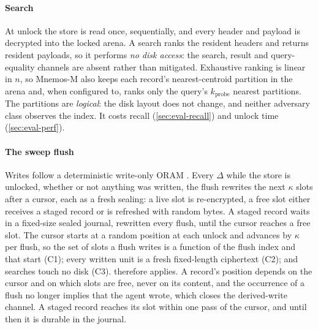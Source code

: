 \paragraph{Search} At unlock the store is read once, sequentially, and every header and payload is
decrypted into the locked arena. A search ranks the resident headers and returns resident payloads,
so it performs \emph{no disk access}: the search, result and query-equality channels are absent
rather than mitigated. Exhaustive ranking is linear in $n$, so Mnemos-M also keeps each record's
nearest-centroid partition in the arena and, when configured to, ranks only the query's $k_{\mathrm{probe}}$
nearest partitions. The partitions are \emph{logical}: the disk layout does not change, and neither adversary
class observes the index. It costs recall (\cref{sec:eval-recall}) and unlock time
(\cref{sec:eval-perf}).

\paragraph{The sweep flush} Writes follow a deterministic write-only ORAM
\cite{roche2017detwooram}. Every $\Delta$ while the store is unlocked, whether or not anything was
written, the flush rewrites the next $\kappa$ slots after a cursor, each as a fresh sealing: a live slot
is re-encrypted, a free slot either receives a staged record or is refreshed with random bytes. A
staged record waits in a fixed-size sealed journal, rewritten every flush, until the cursor reaches a
free slot. The cursor starts at a random position at each unlock and advances by $\kappa$ per flush, so
the set of slots a flush writes is a function of the flush index and that start (C1); every written unit is a
fresh fixed-length ciphertext (C2); and searches touch no disk (C3).  therefore
applies. A record's position depends on the cursor and on which slots are free, never on its content,
and the occurrence of a flush no longer implies that the agent wrote, which closes the derived-write
channel. A staged record reaches its slot within one pass of the cursor, and until then it is durable
in the journal.

